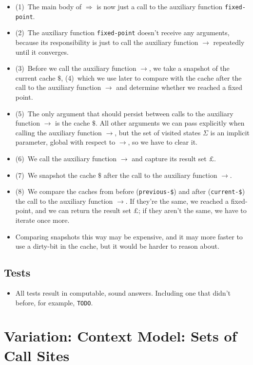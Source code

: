 \documentclass[12pt, oneside]{book}
\begin{document}
\begin{itemize}
  \item (1)~The main body of \(⇒\) is now just a call to the auxiliary function \texttt{fixed-point}.
  \item (2)~The auxiliary function \texttt{fixed-point} doesn’t receive any arguments, because its responsibility is just to call the auxiliary function \(→\) repeatedly until it converges.
  \item (3)~Before we call the auxiliary function \(→\), we take a snapshot of the current cache \(\$\), (4)~which we use later to compare with the cache after the call to the auxiliary function \(→\) and determine whether we reached a fixed point.
  \item (5)~The only argument that should persist between calls to the auxiliary function \(→\) is the cache \(\$\). All other arguments we can pass explicitly when calling the auxiliary function \(→\), but the set of visited states \(Σ\) is an implicit parameter, global with respect to \(→\), so we have to clear it.
  \item (6)~We call the auxiliary function \(→\) and capture its result set \(£\).
  \item (7)~We snapshot the cache \(\$\) after the call to the auxiliary function \(→\).
  \item (8)~We compare the caches from before (\texttt{previous-\$}) and after (\texttt{current-\$}) the call to the auxiliary function \(→\). If they’re the same, we reached a fixed-point, and we can return the result set \(£\); if they aren’t the same, we have to iterate once more.
  \item Comparing snapshots this way may be expensive, and it may more faster to use a dirty-bit in the cache, but it would be harder to reason about.
\end{itemize}

\subsection{Tests}

\begin{itemize}
  \item All tests result in computable, sound answers. Including one that didn’t before, for example, \texttt{TODO}.
\end{itemize}

\section{Variation: Context Model: Sets of Call Sites}
\end{document}
